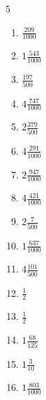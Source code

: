 \documentclass[12pt]{article}
\begin{document}
\begin{multicols}{5}
\begin{enumerate}
		\item $ \frac{209}{1000} $
		\item $ 1 \frac{543}{1000} $
		\item $ \frac{197}{500} $
		\item $ 4 \frac{747}{1000} $
		\item $ 2 \frac{379}{500} $
		\item $ 4 \frac{291}{1000} $
		\item $ 2 \frac{947}{1000} $
		\item $ 4 \frac{421}{1000} $
		\item $ 2 \frac{7}{500} $
		\item $ 1 \frac{637}{1000} $
		\item $ 4 \frac{101}{500} $
		\item $ \frac{1}{2} $
		\item $ \frac{1}{2} $
		\item $ 1 \frac{68}{125} $
		\item $ 1 \frac{3}{10} $
		\item $ 1 \frac{803}{1000} $
	\end{enumerate}\end{multicols}\newpage
\end{document}
